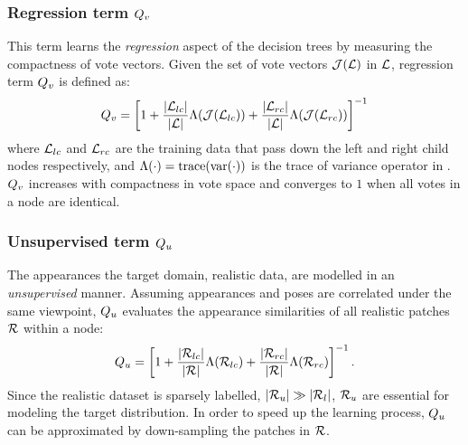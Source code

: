 \subsubsection{Regression term $Q_{v}$} This term learns the \emph{regression} aspect of the decision trees by measuring the compactness of vote vectors. Given the set of vote vectors $\mathcal{J}(\mathcal{L})$ in $\mathcal{L}$, regression term $Q_{v}$ is defined as:
\begin{equation}
	Q_{v} = \left[ 1 + 
	\frac{|\mathcal{L}_{lc}|}{|\mathcal{L}|} \mathrm{\Lambda}(\mathcal{J}(\mathcal{L}_{lc})) +  
\frac{|\mathcal{L}_{rc}|}{|\mathcal{L}|} \mathrm{\Lambda}(\mathcal{J}(\mathcal{L}_{rc})) \right]^{-1}
	\label{eq:regterm}
\end{equation}
where $\mathcal{L}_{lc}$ and $\mathcal{L}_{rc}$ are the training data that pass down the left and right child nodes respectively, and $\mathrm{\Lambda}(\cdot) = \mathrm{trace}(\mathrm{var}(\cdot))$ is the trace of variance operator in \cite{Gall2011}. 
$Q_{v}$ increases with compactness in vote space and converges to $1$ when all votes in a node are identical.

\subsubsection{Unsupervised term $Q_{u}$} The appearances the target domain, \ie realistic data, are modelled in an \emph{unsupervised} manner. 
Assuming appearances and poses are correlated under the same viewpoint, $Q_{u}$ evaluates the appearance similarities of all realistic patches $\mathcal{R}$ within a node:    
\begin{equation}
	Q_{u} = \left[ 1 + 
	\frac{|\mathcal{R}_{lc}|}{|\mathcal{R}|} \mathrm{\Lambda}(\mathcal{R}_{lc}) +  
\frac{|\mathcal{R}_{rc}|}{|\mathcal{R}|} \mathrm{\Lambda}(\mathcal{R}_{rc}) \right]^{-1}.  
	\label{eq:usterm}
\end{equation}
Since the realistic dataset is sparsely labelled, \ie$|\mathcal{R}_{u}| \gg |\mathcal{R}_{l}|$, $\mathcal{R}_{u}$ are essential for modeling the target distribution. 
In order to speed up the learning process, $Q_{u}$ can be approximated by down-sampling the patches in $\mathcal{R}$. 

